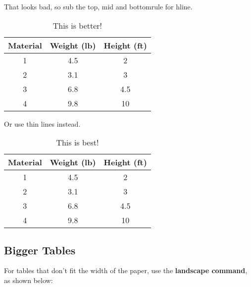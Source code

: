 \noindent That looks bad, so sub the top, mid and bottomrule for hline.

\begin{table}[htbp]
  \centering
  \caption{This is better!}
    \begin{tabular}{|c|c|c|}
    \hline
    \textbf{Material} & \textbf{Weight (lb)} & \textbf{Height (ft)} \\
    \hline
    1     & 4.5   & 2 \\
    \hline
    2     & 3.1   & 3 \\
    \hline
    3     & 6.8   & 4.5 \\
    \hline
    4     & 9.8   & 10 \\
    \hline
    \end{tabular}%
  \label{tab:table2}%
\end{table}%


\noindent Or use thin lines instead.

\begin{table}[htbp]
  \centering
  \caption{This is best!}
    \begin{tabular}{ccc}
    \toprule
    \textbf{Material} & \textbf{Weight (lb)} & \textbf{Height (ft)} \\
    \midrule
    1     & 4.5   & 2 \\
    2     & 3.1   & 3 \\
    3     & 6.8   & 4.5 \\
    4     & 9.8   & 10 \\
    \bottomrule
    \end{tabular}%
  \label{tab:table4}%
\end{table}%







\subsection{Bigger Tables}
\noindent For tables that don't fit the width of the paper, use the \textbf{landscape command}, as shown below:

